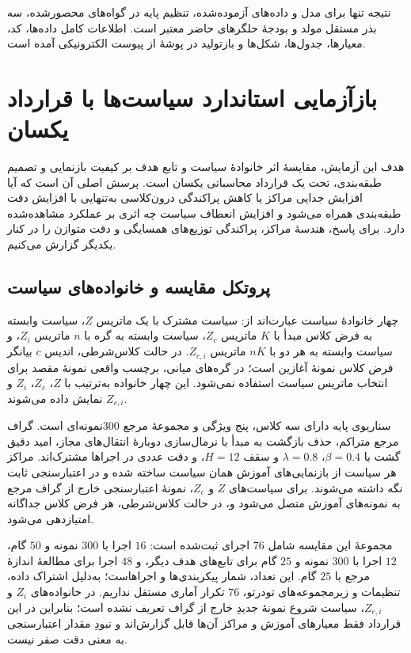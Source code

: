 نتیجه تنها برای مدل و داده‌های آزموده‌شده، تنظیم پایه در گواه‌های محصورشده، سه بذر مستقل مولد و بودجهٔ حلگرهای حاضر معتبر است. اطلاعات کامل داده‌ها، کد، معیارها، جدول‌ها، شکل‌ها و بازتولید در پوشهٔ  از پیوست الکترونیکی آمده است.

\section{بازآزمایی استاندارد سیاست‌ها با قرارداد یکسان}
\label{sec:ch4-standard-policy-comparison}

هدف این آزمایش، مقایسهٔ اثر خانوادهٔ سیاست و تابع هدف بر کیفیت بازنمایی و تصمیم طبقه‌بندی، تحت یک قرارداد محاسباتی یکسان است. پرسش اصلی آن است که آیا افزایش جدایی مراکز یا کاهش پراکندگی درون‌کلاسی به‌تنهایی با افزایش دقت طبقه‌بندی همراه می‌شود و افزایش انعطاف سیاست چه اثری بر عملکرد مشاهده‌شده دارد. برای پاسخ، هندسهٔ مراکز، پراکندگی توزیع‌های همسایگی و دقت متوازن را در کنار یکدیگر گزارش می‌کنیم.

\subsection{پروتکل مقایسه و خانواده‌های سیاست}
\label{subsec:ch4-v1-policy-families}

چهار خانوادهٔ سیاست عبارت‌اند از: سیاست مشترک با یک ماتریس $Z$، سیاست وابسته به فرض کلاس مبدأ با $K$ ماتریس $Z_c$، سیاست وابسته به گره با $n$ ماتریس $Z_i$، و سیاست وابسته به هر دو با $nK$ ماتریس $Z_{c,i}$. در حالت کلاس‌شرطی، اندیس $c$ بیانگر فرض کلاس نمونهٔ آغازین است؛ در گره‌های میانی، برچسب واقعی نمونهٔ مقصد برای انتخاب ماتریس سیاست استفاده نمی‌شود. این چهار خانواده به‌ترتیب با $Z$، $Z_c$، $Z_i$ و $Z_{c,i}$ نمایش داده می‌شوند.

سناریوی پایه دارای سه کلاس، پنج ویژگی و مجموعهٔ مرجع $300$نمونه‌ای است. گراف مرجع متراکم، حذف بازگشت به مبدأ با نرمال‌سازی دوبارهٔ انتقال‌های مجاز، امید دقیق گشت با $\beta=0.4$، $\lambda=0.8$ و سقف $H=12$، و دقت عددی  در اجراها مشترک‌اند. مراکز هر سیاست از بازنمایی‌های آموزش همان سیاست ساخته شده و در اعتبارسنجی ثابت نگه داشته می‌شوند. برای سیاست‌های $Z$ و $Z_c$، نمونهٔ اعتبارسنجی خارج از گراف مرجع به نمونه‌های آموزش متصل می‌شود و، در حالت کلاس‌شرطی، هر فرض کلاس جداگانه امتیازدهی می‌شود.

مجموعهٔ این مقایسه شامل $76$ اجرای ثبت‌شده است: $16$ اجرا با $300$ نمونه و $50$ گام، $12$ اجرا با $300$ نمونه و $25$ گام برای تابع‌های هدف دیگر، و $48$ اجرا برای مطالعهٔ اندازهٔ مرجع با $25$ گام. این تعداد، شمار پیکربندی‌ها و اجراهاست؛ به‌دلیل اشتراک داده، تنظیمات و زیرمجموعه‌های تو‌در‌تو، $76$ تکرار آماری مستقل نداریم. در خانواده‌های $Z_i$ و $Z_{c,i}$، سیاست شروع نمونهٔ جدیدِ خارج از گراف تعریف نشده است؛ بنابراین در این قرارداد فقط معیارهای آموزش و مراکز آن‌ها قابل گزارش‌اند و نبودِ مقدار اعتبارسنجی به معنی دقت صفر نیست.


